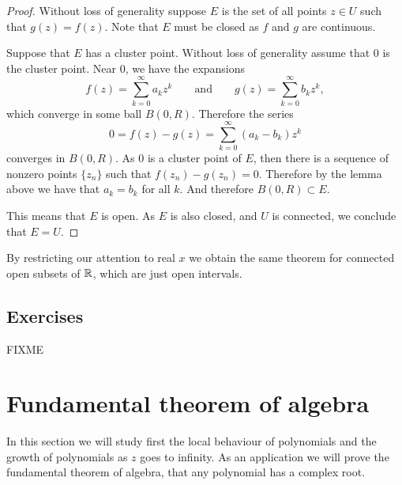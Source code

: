\begin{proof}
Without loss of generality suppose $E$ is the set of all points $z \in U$ such that
$g(z)=f(z)$.  Note that $E$ must be closed as $f$ and $g$ are continuous.

Suppose that $E$ has a cluster point.  Without loss of generality assume that $0$ is the cluster point.  Near 0,
we have the expansions
\begin{equation*}
f(z) = \sum_{k=0}^\infty a_k {z}^k 
\qquad
\text{and}
\qquad
g(z) = \sum_{k=0}^\infty b_k {z}^k ,
\end{equation*}
which converge in some ball $B(0,R)$.  Therefore the series
\begin{equation*}
0 = f(z)-g(z) = 
\sum_{k=0}^\infty (a_k-b_k) z^k
\end{equation*}
converges in $B(0,R)$.  As $0$ is a cluster point of $E$, then there
is a sequence of nonzero points $\{ z_n \}$ such that
$f(z_n) -g(z_n) = 0$.  Therefore by the lemma above we have
that $a_k = b_k$ for all $k$.  And therefore $B(0,R) \subset E$.

This means that $E$ is open.  As $E$ is also closed, and $U$ is connected, we conclude that $E = U$.
\end{proof}

By restricting our attention to real $x$ we obtain the same
theorem for connected open subsets of ${\mathbb{R}}$, which are just open intervals.

\subsection{Exercises}

\begin{exercise}
FIXME
\end{exercise}


\sectionnewpage
\section{Fundamental theorem of algebra}
\label{sec:fundalgeb}


In this section we will study first the local behaviour of polynomials
and the growth of polynomials as $z$ goes to infinity.  As an application
we will prove the fundamental theorem of algebra, that any polynomial
has a complex root.

